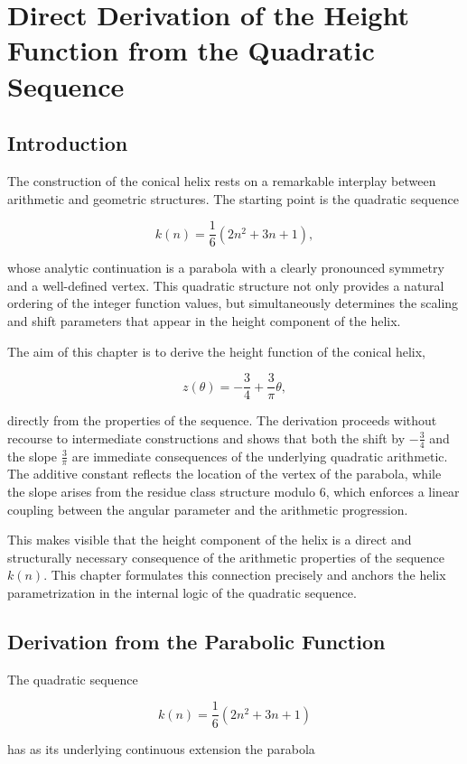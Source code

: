 \chapter{Direct Derivation of the Height Function from the Quadratic Sequence}
\section{Introduction}

The construction of the conical helix rests on a remarkable
interplay between arithmetic and geometric structures.
The starting point is the quadratic sequence


\[
k(n)=\frac{1}{6}(2n^{2}+3n+1),
\]


whose analytic continuation is a parabola with a clearly pronounced
symmetry and a well-defined vertex. This
quadratic structure not only provides a natural ordering of the
integer function values, but simultaneously determines the
scaling and shift parameters that appear in the height component of the
helix.

The aim of this chapter is to derive the height function of the conical helix,


\[
z(\theta)=-\frac{3}{4}+\frac{3}{\pi}\theta,
\]


directly from the properties of the sequence. The derivation proceeds
without recourse to intermediate constructions and shows that both the
shift by $-\tfrac{3}{4}$ and the slope $\tfrac{3}{\pi}$
are immediate consequences of the underlying quadratic
arithmetic. The additive constant reflects the location of the
vertex of the parabola, while the slope arises from the
residue class structure modulo $6$, which enforces a linear coupling
between the angular parameter and the arithmetic progression.

This makes visible that the height component of the helix is a direct and structurally
necessary consequence of the arithmetic properties of the sequence
$k(n)$. This chapter formulates this connection precisely and
anchors the helix parametrization in the internal logic of the
quadratic sequence.

\section{Derivation from the Parabolic Function}

The quadratic sequence


\[
k(n)=\frac{1}{6}(2n^{2}+3n+1)
\]


has as its underlying continuous extension the parabola



